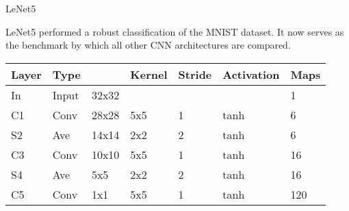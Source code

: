 \documentclass[10pt, table, dvipsnames,xcdraw, handout]{beamer}
\begin{document}
\begin{frame}[fragile]{LeNet5}
  \begin{minipage}[t][0.4\textheight][t]{\textwidth}
LeNet5 performed a robust classification of the MNIST dataset. It now serves as the benchmark by which all other CNN architectures are compared.
  \end{minipage}
\begin{minipage}[t][0.6\textheight][t]{\textwidth}

\begin{table}[]
\begin{tabular}{|l|l|l|l|l|l|l|}
\hline
\rowcolor[HTML]{656565} 
{\color[HTML]{EFEFEF} Layer} & {\color[HTML]{EFEFEF} Type} & \multicolumn{1}{c|}{\cellcolor[HTML]{656565}{\color[HTML]{EFEFEF} Size}} & {\color[HTML]{EFEFEF} Kernel} & {\color[HTML]{EFEFEF} Stride} & {\color[HTML]{EFEFEF} Activation} & {\color[HTML]{EFEFEF} Maps} \\ \hline
In                           & Input                       & 32x32                                                                    &                               &                               &                                   & 1                           \\ \hline
C1                           & Conv                        & 28x28                                                                    & 5x5                           & 1                             & tanh                              & 6                           \\ \hline
S2                           & Ave                         & 14x14                                                                    & 2x2                           & 2                             & tanh                              & 6                           \\ \hline
C3                           & Conv                        & 10x10                                                                    & 5x5                           & 1                             & tanh                              & 16                          \\ \hline
S4                           & Ave                         & 5x5                                                                      & 2x2                           & 2                             & tanh                              & 16                          \\ \hline
C5                           & Conv                        & 1x1                                                                      & 5x5                           & 1                             & tanh                              & 120                         \\ \hline

\end{tabular}
\end{table}
\end{minipage}
\end{frame}
\end{document}
